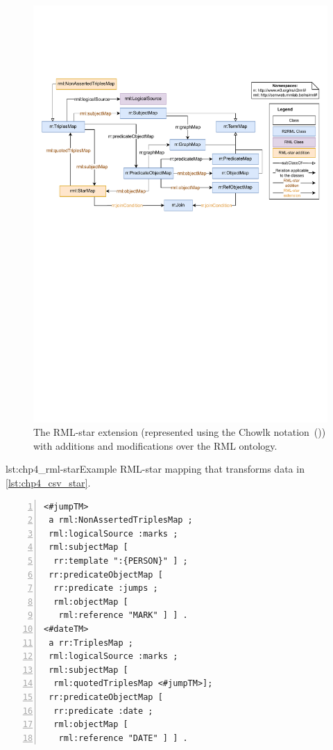 \begin{figure}[!t]
\centering
\includegraphics[width=1\linewidth]{figures/rml-star_diagram.pdf}
\caption{The \mbox{RML-star} extension (represented using the Chowlk notation~(\cite{feria2022chowlk})) with additions and modifications over the RML ontology.}
\label{fig:rml-star}
\end{figure}

\begin{minipage}{\linewidth}
\centering
\begin{captionedlisting}{lst:chp4_rml-star}{Example RML-star mapping that transforms data in \cref{lst:chp4_csv_star}.}
\centering
\begin{multicols}{2}
{\begin{lstlisting}[numbers=left,basicstyle=\ttfamily\small,label={list:example1},columns=flexible,]
<#jumpTM> 
 a rml:NonAssertedTriplesMap ;
 rml:logicalSource :marks ;
 rml:subjectMap [ 
  rr:template ":{PERSON}" ] ;
 rr:predicateObjectMap [ 
  rr:predicate :jumps ;
  rml:objectMap [
   rml:reference "MARK" ] ] .
<#dateTM> 
 a rr:TriplesMap ;
 rml:logicalSource :marks ;
 rml:subjectMap [ 
  rml:quotedTriplesMap <#jumpTM>];
 rr:predicateObjectMap [ 
  rr:predicate :date ;
  rml:objectMap [
   rml:reference "DATE" ] ] .
\end{lstlisting}}

\end{multicols}
\end{captionedlisting}
\end{minipage}

